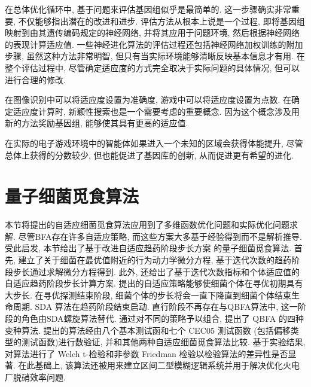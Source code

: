 在总体优化循环中, 基于问题来评估基因组似乎是最简单的.
这一步骤确实非常重要, 不仅能够指出潜在的改进和进步.
评估方法从根本上说是一个过程, 即将基因组映射到由其遗传编码规定的神经网络, 并将其应用于问题环境, 然后根据神经网络的表现计算适应值.
一些神经进化算法的评估过程还包括神经网络加权训练的附加步骤, 虽然这种方法非常明智, 但只有当实际环境能够清晰反映基本信息才有用.
在整个评估过程中, 尽管确定适应度的方式完全取决于实际问题的具体情况, 但可以进行合理的修改.
\begin{example}
    在图像识别中可以将适应度设置为准确度, 游戏中可以将适应度设置为点数.
    在确定适应度计算时, 新颖性搜索也是一个需要考虑的重要概念.
    因为这个概念涉及用新的方法奖励基因组, 能够使其具有更高的适应值.
\end{example}
\begin{example}
    在实际的电子游戏环境中的智能体如果进入一个未知的区域会获得体能提升, 尽管总体上获得的分数较少, 但也能促进了基因库的创新, 从而促进更有希望的进化.
\end{example}
\section{量子细菌觅食算法}
本节将提出的自适应细菌觅食算法应用到了多维函数优化问题和实际优化问题求解. 尽管BFA存在许多自适应策略, 而这些方案大多基于经验得到而不是解析推导.
受此启发, 本节给出了基于改进自适应趋药阶段步长方案 的量子细菌觅食算法.
首先, 建立了关于细菌在最优值附近的行为动力学微分方程, 基于迭代次数的趋药阶段步长通过求解微分方程得到.
此外, 还给出了基于迭代次数指标和个体适应值的自适应趋药阶段步长计算方案.
提出的自适应策略能够使细菌个体在寻优初期具有大步长. 在寻优探测结束阶段, 细菌个体的步长将会一直下降直到细菌个体结束生命周期.
SDA 算法在趋药阶段结束启动. 直行阶段不再存在与QBFA算法中, 这一阶段的角色由SDA螺旋算法替代.
通过对不同的策略予以组合, 提出了 QBFA 的四种变种算法.
提出的算法经由八个基本测试函和七个  CEC05 测试函数 (包括偏移类型的测试函数)进行数验证, 并和其他两种自适应细菌觅食算法比较.
基于实验结果, 对算法进行了 Welch t-检验和非参数 Friedman 检验以检验算法的差异性是否显著.
在此基础上, 该算法还被用来建立区间二型模糊逻辑系统并用于解决优化火电厂脱硝效率问题.

